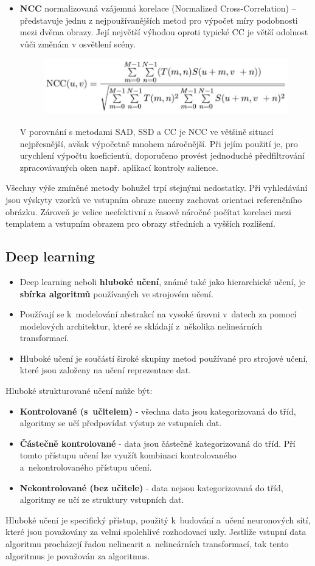 \begin{itemize}
\item \textbf{NCC} normalizovaná vzájemná korelace (Normalized Cross-Correlation) -- představuje jednu z nejpoužívanějších metod pro výpočet míry podobnosti mezi dvěma obrazy. Její největší výhodou oproti typické CC je větší odolnost vůči změnám v osvětlení scény.
\begin{figure}[H]
\centering
\includegraphics[width=.6\linewidth]{assets/9_ncc}
\end{figure}
V porovnání s metodami SAD, SSD a CC je NCC ve většině situací nejpřesnější, avšak výpočetně mnohem náročnější. Při jejím použití je, pro urychlení výpočtu koeficientů, doporučeno provést jednoduché předfiltrování zpracovávaných oken např. aplikací kontroly salience.
\end{itemize}

Všechny výše zmíněné metody bohužel trpí stejnými nedostatky. Při vyhledávání jsou výskyty vzorků ve vstupním obraze nuceny zachovat orientaci referenčního obrázku. Zároveň je velice neefektivní a časově náročné počítat korelaci mezi templatem a vstupním obrazem pro obrazy středních a vyšších rozlišení.

\subsection{Deep learning}
\begin{itemize}
  \item Deep learning neboli \textbf{hluboké učení}, známé také jako hierarchické učení, je \textbf{sbírka algoritmů} používaných ve strojovém učení.
  \item Používají se k~modelování abstrakcí na vysoké úrovni v~datech za pomocí modelových architektur, které se skládají z~několika nelineárních transformací.
  \item Hluboké učení je součástí široké skupiny metod používané pro strojové učení, které jsou založeny na učení reprezentace dat.
\end{itemize}
Hluboké strukturované učení může být:
\begin{itemize}
  \item{\textbf{Kontrolované (s~učitelem)} - všechna data jsou kategorizovaná do tříd, algoritmy se učí předpovídat výstup ze vstupních dat.}
  \item{\textbf{Částečně kontrolované} - data jsou částečně kategorizovaná do tříd. Pří tomto přístupu učení lze využít kombinaci kontrolovaného a~nekontrolovaného přístupu učení.}
  \item{\textbf{Nekontrolované (bez učitele)} - data nejsou kategorizovaná do tříd, algoritmy se učí ze struktury vstupních dat.}
\end{itemize}
Hluboké učení je specifický přístup, použitý k~budování a~učení neuronových sítí, které jsou považovány za velmi spolehlivé rozhodovací uzly. Jestliže vstupní data algoritmu procházejí řadou nelinearit a~nelineárních transformací, tak tento algoritmus je považován za  algoritmus. 

